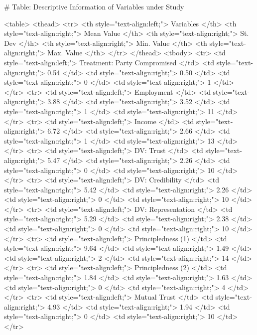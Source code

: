 # Table: Descriptive Information of Variables under Study 

<table>
 <thead>
  <tr>
   <th style="text-align:left;"> Variables </th>
   <th style="text-align:right;"> Mean Value </th>
   <th style="text-align:right;"> St. Dev </th>
   <th style="text-align:right;"> Min. Value </th>
   <th style="text-align:right;"> Max. Value </th>
  </tr>
 </thead>
<tbody>
  <tr>
   <td style="text-align:left;"> Treatment: Party Compromised </td>
   <td style="text-align:right;"> 0.54 </td>
   <td style="text-align:right;"> 0.50 </td>
   <td style="text-align:right;"> 0 </td>
   <td style="text-align:right;"> 1 </td>
  </tr>
  <tr>
   <td style="text-align:left;"> Employment </td>
   <td style="text-align:right;"> 3.88 </td>
   <td style="text-align:right;"> 3.52 </td>
   <td style="text-align:right;"> 1 </td>
   <td style="text-align:right;"> 11 </td>
  </tr>
  <tr>
   <td style="text-align:left;"> Income </td>
   <td style="text-align:right;"> 6.72 </td>
   <td style="text-align:right;"> 2.66 </td>
   <td style="text-align:right;"> 1 </td>
   <td style="text-align:right;"> 13 </td>
  </tr>
  <tr>
   <td style="text-align:left;"> DV: Trust </td>
   <td style="text-align:right;"> 5.47 </td>
   <td style="text-align:right;"> 2.26 </td>
   <td style="text-align:right;"> 0 </td>
   <td style="text-align:right;"> 10 </td>
  </tr>
  <tr>
   <td style="text-align:left;"> DV: Credibility </td>
   <td style="text-align:right;"> 5.42 </td>
   <td style="text-align:right;"> 2.26 </td>
   <td style="text-align:right;"> 0 </td>
   <td style="text-align:right;"> 10 </td>
  </tr>
  <tr>
   <td style="text-align:left;"> DV: Representation </td>
   <td style="text-align:right;"> 5.29 </td>
   <td style="text-align:right;"> 2.38 </td>
   <td style="text-align:right;"> 0 </td>
   <td style="text-align:right;"> 10 </td>
  </tr>
  <tr>
   <td style="text-align:left;"> Principledness (1) </td>
   <td style="text-align:right;"> 9.64 </td>
   <td style="text-align:right;"> 1.49 </td>
   <td style="text-align:right;"> 2 </td>
   <td style="text-align:right;"> 14 </td>
  </tr>
  <tr>
   <td style="text-align:left;"> Principledness (2) </td>
   <td style="text-align:right;"> 1.84 </td>
   <td style="text-align:right;"> 1.63 </td>
   <td style="text-align:right;"> 0 </td>
   <td style="text-align:right;"> 4 </td>
  </tr>
  <tr>
   <td style="text-align:left;"> Mutual Trust </td>
   <td style="text-align:right;"> 4.93 </td>
   <td style="text-align:right;"> 1.94 </td>
   <td style="text-align:right;"> 0 </td>
   <td style="text-align:right;"> 10 </td>
  </tr>
